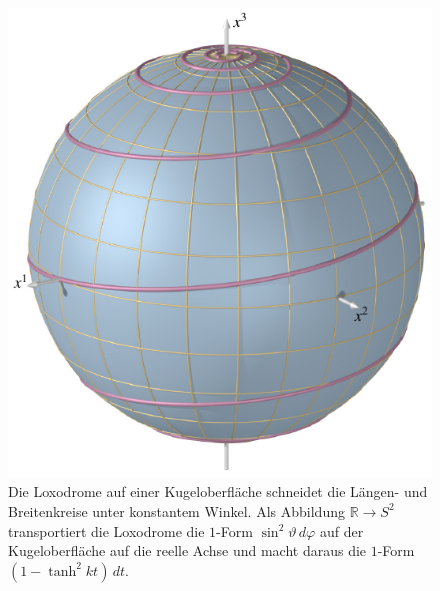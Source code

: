 %
%
%
\begin{figure}
\centering
\includegraphics{chapters/030-kurvenintegral/images/loxodrome.pdf}
\caption{Die Loxodrome auf einer Kugeloberfläche schneidet die Längen- und
Breitenkreise unter konstantem Winkel.
Als Abbildung $\mathbb{R}\to S^2$ transportiert die Loxodrome die
$1$-Form $\sin^2\vartheta\,d\varphi$ auf der Kugeloberfläche auf die
reelle Achse und macht daraus die $1$-Form $(1-\tanh^2 kt)\,dt$.
\label{buch:kurvenintegral:fig:loxodrome}}
\end{figure}
